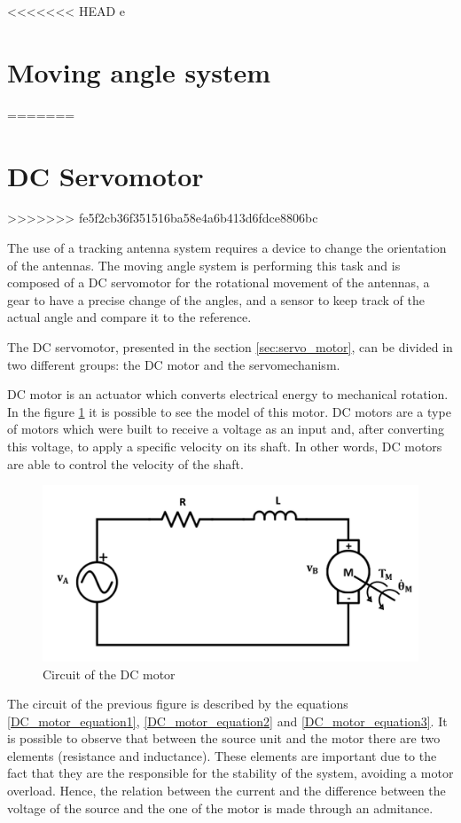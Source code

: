 <<<<<<< HEAD
e\section{Moving angle system}\label{servo_model}
=======
\section{DC Servomotor}\label{sec:servo_model}
>>>>>>> fe5f2cb36f351516ba58e4a6b413d6fdce8806bc

The use of a tracking antenna system requires a device to change the orientation of the antennas. The moving angle system is performing this task and is composed of a DC servomotor for the rotational movement of the antennas, a gear to have a precise change of the angles, and a sensor to keep track of the actual angle and compare it to the reference.

The DC servomotor, presented in the section \ref{sec:servo_motor}, can be divided in two different groups: the DC motor and the servomechanism.

DC motor is an actuator which converts electrical energy to mechanical rotation. In the figure \ref{dcmotor_circuit} it is possible to see the model of this motor. DC motors are a type of motors which were built to receive a voltage as an input and, after converting this voltage, to apply a specific velocity on its shaft. In other words, DC motors are able to control the velocity of the shaft.

\begin{figure}[H]
\centering
\includegraphics[scale=0.5]{figures/dcmotor_circuit.png}
\caption{Circuit of the DC motor}
\label{dcmotor_circuit}
\end{figure}

The circuit of the previous figure is described by the equations \ref{DC_motor_equation1}, \ref{DC_motor_equation2} and \ref{DC_motor_equation3}. It is possible to observe that between the source unit and the motor there are two elements (resistance and inductance). These elements are important due to the fact that they are the responsible for the stability of the system, avoiding a motor overload. Hence, the relation between the current and the difference between the voltage of the source and the one of the motor is made through an admitance.


